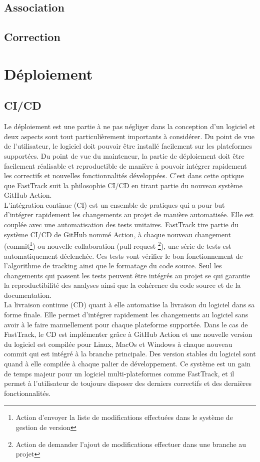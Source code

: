 		
		\subsection{Association}
		\subsection{Correction}
		
	\section{Déploiement}
		\subsection{CI/CD}
		Le déploiement est une partie à ne pas négliger dans la conception d'un logiciel et deux aspects sont tout particulièrement importants à considérer. Du point de vue de l'utilisateur, le logiciel doit pouvoir être installé facilement sur les plateformes supportées. Du point de vue du mainteneur, la partie de déploiement doit être facilement réalisable et reproductible de manière à pouvoir intégrer rapidement les correctifs et nouvelles fonctionnalités développées. C'est dans cette optique que FastTrack suit la philosophie CI/CD en tirant partie du nouveau système GitHub Action.\\
		
		L'intégration continue (CI) est un ensemble de pratiques qui a pour but d'intégrer rapidement les changements au projet de manière automatisée. Elle est couplée avec une automatisation des tests unitaires. FastTrack tire partie du système CI/CD de GitHub nommé Action, à chaque nouveau changement (commit\footnote{Action d'envoyer la liste de modifications effectuées dans le système de gestion de version}) ou nouvelle collaboration (pull-request \footnote{Action de demander l'ajout de modifications effectuer dans une branche au projet}), une série de tests est automatiquement déclenchée. Ces tests vont vérifier le bon fonctionnement de l'algorithme de tracking ainsi que le formatage du code source. Seul les changements qui passent les tests peuvent être intégrés au projet se qui garantie la reproductibilité des analyses ainsi que la cohérence du code source et de la documentation.\\
		
		La livraison continue (CD) quant à elle automatise la livraison du logiciel dans sa forme finale. Elle permet d'intégrer rapidement les changements au logiciel sans avoir à le faire manuellement pour chaque plateforme supportée. Dans le cas de FastTrack, le CD est implémenter grâce à GitHub Action et une nouvelle version du logiciel est compilée pour Linux, MacOs et Windows à chaque nouveau commit qui est intégré à la branche principale. Des version stables du logiciel sont quand à elle compilée à chaque palier de développement. Ce système est un gain de temps majeur pour un logiciel multi-plateformes comme FastTrack, et il permet à l'utilisateur de toujours disposer des derniers correctifs et des dernières fonctionnalités.\\
		
